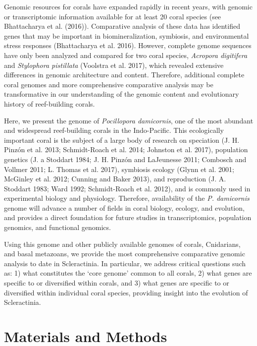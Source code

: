 \documentclass[]{elsarticle} %
\begin{document}
Genomic resources for corals have expanded rapidly in recent years, with
genomic or transcriptomic information available for at least 20 coral
species (see Bhattacharya et al. (2016)). Comparative analysis of these
data has identified genes that may be important in biomineralization,
symbiosis, and environmental stress responses (Bhattacharya et al.
2016). However, complete genome sequences have only been analyzed and
compared for two coral species, \emph{Acropora digitifera} and
\emph{Stylophora pistillata} (Voolstra et al. 2017), which revealed
extensive differences in genomic architecture and content. Therefore,
additional complete coral genomes and more comprehensive comparative
analysis may be transformative in our understanding of the genomic
content and evolutionary history of reef-building corals.

Here, we present the genome of \emph{Pocillopora damicornis}, one of the
most abundant and widespread reef-building corals in the Indo-Pacific.
This ecologically important coral is the subject of a large body of
research on speciation (J. H. Pinzón et al. 2013; Schmidt-Roach et al.
2014; Johnston et al. 2017), population genetics (J. a Stoddart 1984; J.
H. Pinzón and LaJeunesse 2011; Combosch and Vollmer 2011; L. Thomas et
al. 2017), symbiosis ecology (Glynn et al. 2001; McGinley et al. 2012;
Cunning and Baker 2013), and reproduction (J. A. Stoddart 1983; Ward
1992; Schmidt-Roach et al. 2012), and is commonly used in experimental
biology and physiology. Therefore, availability of the \emph{P.
damicornis} genome will advance a number of fields in coral biology,
ecology, and evolution, and provides a direct foundation for future
studies in transcriptomics, population genomics, and functional
genomics.

Using this genome and other publicly available genomes of corals,
Cnidarians, and basal metazoans, we provide the most comprehensive
comparative genomic analysis to date in Scleractinia. In particular, we
address critical questions such as: 1) what constitutes the `core
genome' common to all corals, 2) what genes are specific to or
diversified within corals, and 3) what genes are specific to or
diversified within individual coral species, providing insight into the
evolution of Scleractinia.

\section{Materials and Methods}\label{materials-and-methods}
\end{document}
